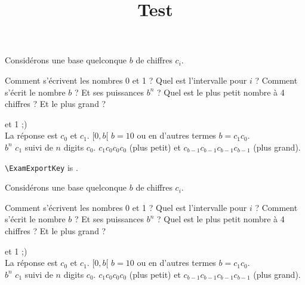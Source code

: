\documentclass{exercice}
\title{Test}
\author{}
\begin{document}
\maketitle
\listofexercises


\begin{Exercise}[title={Système positionnel}]

  Considérons une base quelconque $b$ de chiffres $c_i$.

\Question 
Comment s'écrivent les nombres 0 et 1 ?
\Question
Quel est l’intervalle pour $i$ ?
\Question
Comment s'écrit le nombre $b$ ? Et ses puissances $b^n$ ?
\Question
Quel est le plus petit nombre à 4 chiffres ? Et le plus grand ?
\end{Exercise}

\begin{Answer}
   et 1 ;)  
  \\
  La réponse est $c_0$ et $c_1$.
  \Question
  $[0, b[$
  \Question
  $b=10$ ou en d'autres termes $b=c_1c_0$.
  \\
  $b^n$ $c_1$ suivi de $n$ digits $c_0$. 
  \Question
  $c_1c_0c_0c_0$ (plus petit) et   $c_{b-1}c_{b-1}c_{b-1}c_{b-1}$ (plus grand).
\end{Answer}

\ExamNewpage
{}




\verb|\ExamExportKey| is \texttt{\meaning\ExamExportKey}.



\clearpage 
\begin{Exercise}[title={Système positionnel II}]
  Considérons une base quelconque $b$ de chiffres $c_i$.

\Question 
Comment s'écrivent les nombres 0 et 1 ?
\Question
Quel est l’intervalle pour $i$ ?
\Question
Comment s'écrit le nombre $b$ ? Et ses puissances $b^n$ ?
\Question
Quel est le plus petit nombre à 4 chiffres ? Et le plus grand ?
\end{Exercise}

\begin{Answer}
   et 1 ;)  
  \\
  La réponse est $c_0$ et $c_1$.
  \Question
  $[0, b[$
  \Question
  $b=10$ ou en d'autres termes $b=c_1c_0$.
  \\
  $b^n$ $c_1$ suivi de $n$ digits $c_0$. 
  \Question
  $c_1c_0c_0c_0$ (plus petit) et   $c_{b-1}c_{b-1}c_{b-1}c_{b-1}$ (plus grand).
\end{Answer}
\end{document}
